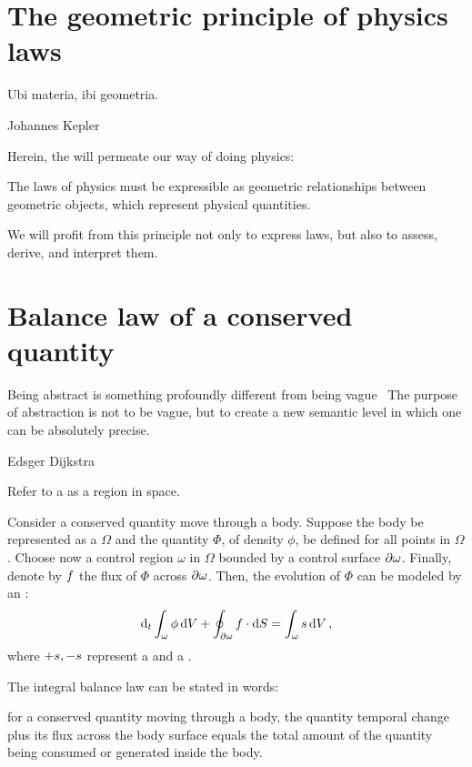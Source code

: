 
\section{The geometric principle of physics laws}
\label{sec:geometric-principle-physics-laws}
%
\epigraph{Ubi materia, ibi geometria.}{Johannes Kepler}

Herein, the  will permeate our way of doing physics:~\cite[chap. 1, p. iii]{thorne2013}
%
\begin{axiom}\label{axm:geometric-principle-physics-laws}
  The laws of physics must be expressible as geometric relationships between geometric objects, which represent physical quantities.
\end{axiom}
%
We will profit from this principle not only to express laws, but also to assess, derive, and interpret them.


\section{Balance law of a conserved quantity}
\label{sec:balance-law-conserved-quantity}
%
\epigraph{Being abstract is something profoundly different from being vague \dotsq\ The purpose of abstraction is not to be vague, but to create a new semantic level in which one can be absolutely precise.}{Edsger Dijkstra}

\begin{definition}
  Refer to a  as a region in space.
\end{definition}

\begin{observation}\label{obs:balance-law-conserved-quantity}
  Consider a conserved quantity move through a body. Suppose the body be represented as a  $\Omega$ and the quantity $\Phi$, of density $\phi$, be defined for all points in  $\Omega$. Choose now a control region $\omega$ in $\Omega$ bounded by a control surface $\partial\omega$. Finally, denote by $f$ the flux of $\Phi$ across $\partial\omega$. Then, the evolution of $\Phi$ can be modeled by an :
  \begin{equation}\label{eqn:integral-balance-law}
    \mathrm{d}_{t}\int_{\omega}\phi\,\mathrm{d} V
    + \oint_{\partial\omega}f\cdot\mathrm{d} S
    =
    \int_{\omega}s\,\mathrm{d} V\,,
  \end{equation}
  where $+s,-s$ represent a  and a .
\end{observation}
%
The integral balance law can be stated in words:~\cite[p. 5]{mishra2016}
%
\begin{law}
  for a conserved quantity moving through a body, the quantity temporal change plus its flux across the body surface equals the total amount of the quantity being consumed or generated inside the body.
\end{law}

